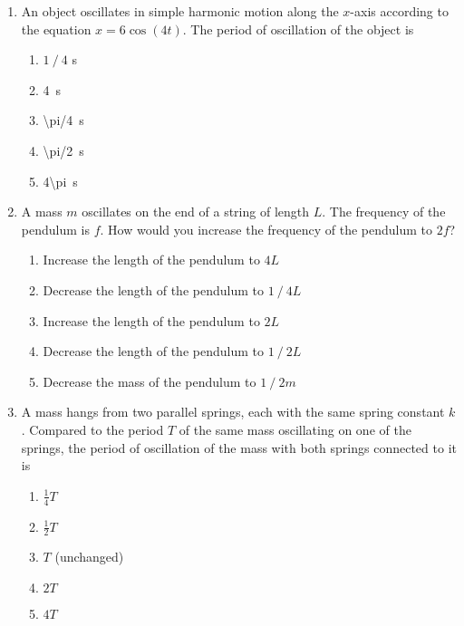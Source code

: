 \documentclass[12pt]{article}
\begin{document}
\begin{enumerate}[leftmargin=50pt,label=\underline{\hspace{0.4in}} \arabic*.]
\item An object oscillates in simple harmonic motion along the $x$-axis
  according to the equation $x = 6 \cos(4t)$. The period of oscillation of the
  object is
  \begin{enumerate}[noitemsep,topsep=0pt]
  \item $1⁄4$ \si{s}
  \item\SI{4}{s}
  \item\SI{\pi/4}{s}
  \item\SI{\pi/2}{s}
  \item\SI{4\pi}{s}
  \end{enumerate}    

\item A mass $m$ oscillates on the end of a string of length $L$. The frequency
  of the pendulum is $f$. How would you increase the frequency of the
  pendulum to $2f$?
  \begin{enumerate}[noitemsep,topsep=0pt]
    \item Increase the length of the pendulum to $4L$
    \item Decrease the length of the pendulum to $1⁄4L$
    \item Increase the length of the pendulum to $2L$
    \item Decrease the length of the pendulum to $1⁄2L$
    \item Decrease the mass of the pendulum to $1⁄2m$
  \end{enumerate}

  \begin{center}
  \end{center}

\item A mass hangs from two parallel springs, each with the same spring
  constant $k$. Compared to the period $T$ of the same mass oscillating on
  one of the springs, the period of oscillation of the mass with both
  springs connected to it is
  \begin{enumerate}[noitemsep,topsep=0pt]
  \item $\frac{1}{4}T$
  \item $\frac{1}{2}T$
  \item $T$ (unchanged)
  \item $2T$
  \item $4T$
  \end{enumerate}


\end{enumerate}
\end{document}
